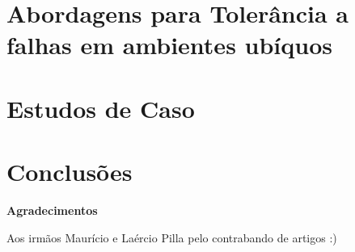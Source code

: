 \documentclass{SBCbookchapter}
\begin{document}
\section{Abordagens para Tolerância a falhas em ambientes ubíquos}
\label{sec:tolerancia}


\section{Estudos de Caso}
\label{sec:estudos}


\section{Conclusões}
\label{sec:conclusoes}


\begin{center}
	\textbf{Agradecimentos}
\end{center}
Aos irmãos Maurício e Laércio Pilla pelo contrabando de artigos :)
	



\end{document}
